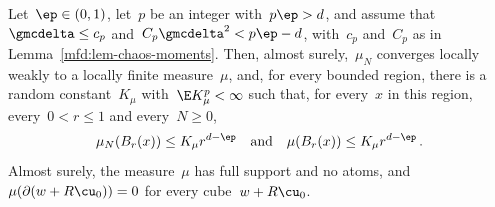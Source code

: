 \documentclass[11pt]{amsart}
\begin{document}
\begin{proposition}
\label{mfd:prop-chaos-growth}
Let~$\ep\in(0,1)$, let~$p$ be an integer with~$p\ep>d$, and assume that~$\gmcdelta\leq c_p$ and~$C_p\gmcdelta^2<p\ep-d$, with~$c_p$ and~$C_p$ as in Lemma~\ref{mfd:lem-chaos-moments}. Then, almost surely,~$\mu_N$ converges locally weakly to a locally finite measure~$\mu$, and, for every bounded region, there is a random constant~$K_\mu$ with~$\E K_\mu^p<\infty$ such that, for every~$x$ in this region, every~$0<r\leq1$ and every~$N\geq0$,
\begin{equation}
	\mu_N(B_r(x))\leq K_\mu r^{d-\ep}
	\quad\text{and}\quad
	\mu(B_r(x))\leq K_\mu r^{d-\ep}\,.
	\label{eq:mfd-39}
\end{equation}
Almost surely, the measure~$\mu$ has full support and no atoms, and~$\mu(\partial(w+R\cu_0))=0$ for every cube~$w+R\cu_0$.
\end{proposition}
\end{document}
